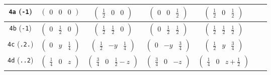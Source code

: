\documentclass[fleqn,9pt,landscape]{jsarticle}
\begin{document}
\begin{center}
\begin{longtable}{ccccccc}
{\tt 4a} ({\tt -1}) & $ \begin{pmatrix} 0 & 0 & 0 \end{pmatrix} $ & $ \begin{pmatrix} \frac{1}{2} & 0 & 0 \end{pmatrix} $ & $ \begin{pmatrix} 0 & 0 & \frac{1}{2} \end{pmatrix} $ & $ \begin{pmatrix} \frac{1}{2} & 0 & \frac{1}{2} \end{pmatrix} $ & $  $ & $  $ \\ \hline
{\tt 4b} ({\tt -1}) & $ \begin{pmatrix} 0 & \frac{1}{2} & 0 \end{pmatrix} $ & $ \begin{pmatrix} \frac{1}{2} & \frac{1}{2} & 0 \end{pmatrix} $ & $ \begin{pmatrix} 0 & \frac{1}{2} & \frac{1}{2} \end{pmatrix} $ & $ \begin{pmatrix} \frac{1}{2} & \frac{1}{2} & \frac{1}{2} \end{pmatrix} $ & $  $ & $  $ \\ \hline
{\tt 4c} ({\tt .2.}) & $ \begin{pmatrix} 0 & y & \frac{1}{4} \end{pmatrix} $ & $ \begin{pmatrix} \frac{1}{2} & - y & \frac{1}{4} \end{pmatrix} $ & $ \begin{pmatrix} 0 & - y & \frac{3}{4} \end{pmatrix} $ & $ \begin{pmatrix} \frac{1}{2} & y & \frac{3}{4} \end{pmatrix} $ & $  $ & $  $ \\ \hline
{\tt 4d} ({\tt ..2}) & $ \begin{pmatrix} \frac{1}{4} & 0 & z \end{pmatrix} $ & $ \begin{pmatrix} \frac{3}{4} & 0 & \frac{1}{2} - z \end{pmatrix} $ & $ \begin{pmatrix} \frac{3}{4} & 0 & - z \end{pmatrix} $ & $ \begin{pmatrix} \frac{1}{4} & 0 & z + \frac{1}{2} \end{pmatrix} $ & $  $ & $  $ \\ \hline

\end{longtable}
\end{center}
\end{document}
